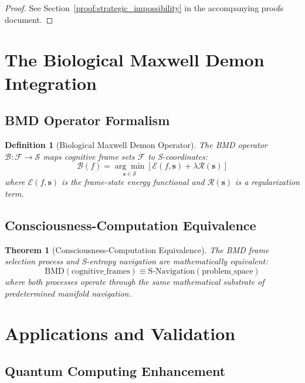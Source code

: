 \documentclass[12pt,a4paper]{article}
\newtheorem{theorem}{Theorem}
\newtheorem{definition}{Definition}
\begin{document}
\begin{proof}
See Section~\ref{proof:strategic_impossibility} in the accompanying proofs document.
\end{proof}

\section{The Biological Maxwell Demon Integration}

\subsection{BMD Operator Formalism}

\begin{definition}[Biological Maxwell Demon Operator]
The BMD operator $\mathcal{B}: \mathcal{F} \to \mathcal{S}$ maps cognitive frame sets $\mathcal{F}$ to S-coordinates:
\begin{equation}
\mathcal{B}(f) = \underset{\mathbf{s} \in \mathcal{S}}{\arg\min} \left[ \mathcal{E}(f, \mathbf{s}) + \lambda \mathcal{R}(\mathbf{s}) \right]
\end{equation}
where $\mathcal{E}(f, \mathbf{s})$ is the frame-state energy functional and $\mathcal{R}(\mathbf{s})$ is a regularization term.
\end{definition}

\subsection{Consciousness-Computation Equivalence}

\begin{theorem}[Consciousness-Computation Equivalence]
\label{thm:consciousness_computation}
The BMD frame selection process and S-entropy navigation are mathematically equivalent:
\begin{equation}
\text{BMD}(\text{cognitive\_frames}) \equiv \text{S-Navigation}(\text{problem\_space})
\end{equation}
where both processes operate through the same mathematical substrate of predetermined manifold navigation.
\end{theorem}

\section{Applications and Validation}

\subsection{Quantum Computing Enhancement}
\end{document}
